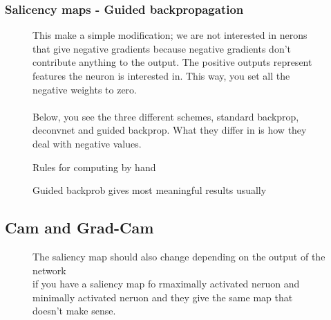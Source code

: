 \documentclass[11pt]{article}
\begin{document}
\subsubsection{Salicency maps - Guided backpropagation}

\begin{figure}[H]
    \centering
    \caption{This make a simple modification; we are not interested in nerons that give negative gradients because negative gradients don't contribute anything to the output. The positive outputs represent features the neuron is interested in. This way, you set all the negative weights to zero.\\\\
    Below, you see the three different schemes, standard backprop, deconvnet and guided backprop. What they differ in is how they deal with negative values.}
\end{figure}

\begin{figure}[H]
    \centering
    \caption{Rules for computing by hand}
\end{figure}

\begin{figure}[H]
    \centering
    \caption{}
\end{figure}

\begin{figure}[H]
    \centering
    \caption{Guided backprob gives most meaningful results usually}
\end{figure}

\subsection{Cam and Grad-Cam}

\begin{figure}[H]
    \centering
    \caption{The saliency map should also change depending on the output of the network\\if you have a saliency map fo rmaximally activated neruon and minimally activated neruon and they give the same map that doesn't make sense.}
\end{figure}
\end{document}
